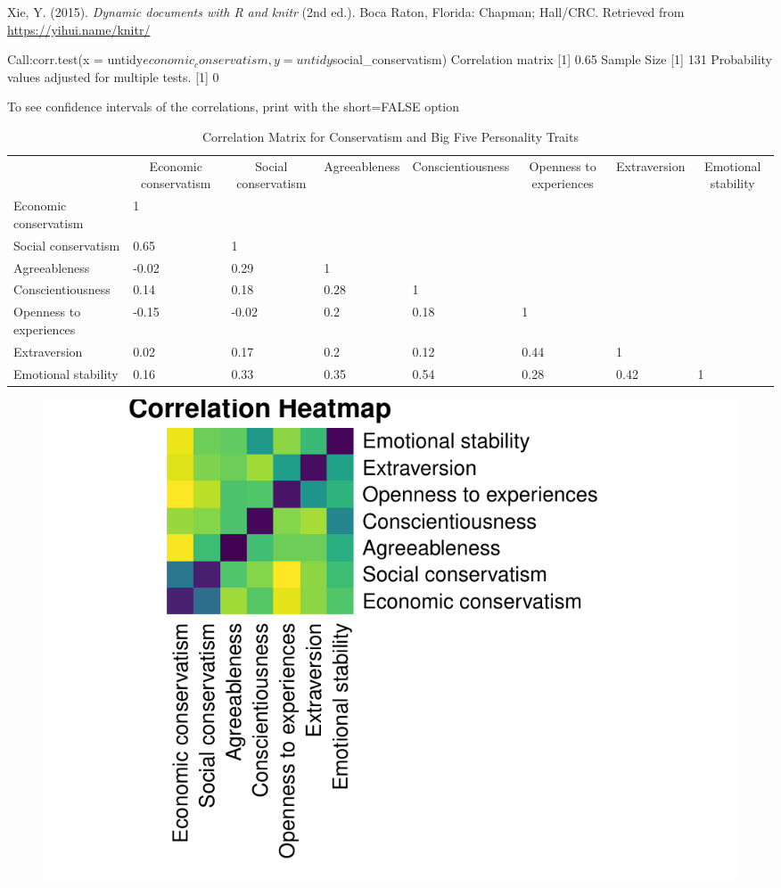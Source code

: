 \documentclass[man]{apa6}
\makeatletter
\newenvironment{lltable}{\begin{landscape}\begin{center}\begin{ThreePartTable}}{\end{ThreePartTable}\end{center}\end{landscape}}
\newcommand\LastLTentrywidth{1em}
\newlength\longtablewidth
\newcommand{\getlongtablewidth}{\begingroup \ifcsname LT@\roman{LT@tables}\endcsname \global\longtablewidth=0pt \renewcommand{\LT@entry}[2]{\global\advance\longtablewidth by ##2\relax\gdef\LastLTentrywidth{##2}}\@nameuse{LT@\roman{LT@tables}} \fi \endgroup}
\makeatother
\begin{document}
\hypertarget{ref-R-knitr}{}
Xie, Y. (2015). \emph{Dynamic documents with R and knitr} (2nd ed.).
Boca Raton, Florida: Chapman; Hall/CRC. Retrieved from
\url{https://yihui.name/knitr/}

Call:corr.test(x =
untidy\(economic_conservatism, y = untidy\)social\_conservatism)
Correlation matrix {[}1{]} 0.65 Sample Size {[}1{]} 131 Probability
values adjusted for multiple tests. {[}1{]} 0

To see confidence intervals of the correlations, print with the
short=FALSE option

\begin{lltable}


\tiny{
\begin{longtable}{llllllll}\noalign{\getlongtablewidth\global\LTcapwidth=\longtablewidth}
\caption{\label{tab:correlations}Correlation Matrix for Conservatism and Big Five Personality Traits}\\
\toprule
 & \multicolumn{1}{c}{Economic conservatism} & \multicolumn{1}{c}{Social conservatism} & \multicolumn{1}{c}{Agreeableness} & \multicolumn{1}{c}{Conscientiousness} & \multicolumn{1}{c}{Openness to experiences} & \multicolumn{1}{c}{Extraversion} & \multicolumn{1}{c}{Emotional stability}\\
\midrule
Economic conservatism & 1 &  &  &  &  &  & \\
Social conservatism & 0.65 & 1 &  &  &  &  & \\
Agreeableness & -0.02 & 0.29 & 1 &  &  &  & \\
Conscientiousness & 0.14 & 0.18 & 0.28 & 1 &  &  & \\
Openness to experiences & -0.15 & -0.02 & 0.2 & 0.18 & 1 &  & \\
Extraversion & 0.02 & 0.17 & 0.2 & 0.12 & 0.44 & 1 & \\
Emotional stability & 0.16 & 0.33 & 0.35 & 0.54 & 0.28 & 0.42 & 1\\
\bottomrule
\end{longtable}
}
\end{lltable}

\begin{figure}
\centering
\includegraphics{manuscript_files/figure-latex/correlations-1.pdf}
\caption{}
\end{figure}
\end{document}
